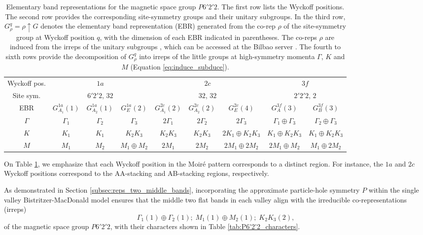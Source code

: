 \begin{table}[H]
\footnotesize
\caption{Elementary band representations for the magnetic space group \( P6'2'2 \). The first row lists the Wyckoff positions. The second row provides the corresponding site-symmetry groups and their unitary subgroups. In the third row, \( G_\rho^q = \rho \uparrow G \) denotes the elementary band representation (EBR) generated from the co-rep \( \rho \) of the site-symmetry group at Wyckoff position \( q \), with the dimension of each EBR indicated in parentheses. The co-reps \( \rho \) are induced from the irreps of the unitary subgroups \cite{bradley_representation_theory_2010}, which can be accessed at the Bilbao server \cite{bilbao_1}. The fourth to sixth rows provide the decomposition of $G_\rho^q$ into irreps of the little groups at high-symmetry momenta $\Gamma$, $K$ and $M$ (Equation \ref{eq:induce_subduce}).}
\centering
\begin{tabular}{|c|c|c|c|c|c|c|c|c|}
\hline
Wyckoff pos. & \multicolumn{3}{c|}{$1a$} & \multicolumn{3}{c|}{$2c$} & \multicolumn{2}{c|}{$3f$} \\
\cline{1-9}
Site sym. & \multicolumn{3}{c|}{$6'2'2$, $32$} & \multicolumn{3}{c|}{$32$, $32$} & \multicolumn{2}{c|}{$2'2'2$, $2$} \\
\cline{1-9}
EBR & $G_{A_1}^{1a}(1)$ & $G_{A_2}^{1a}(1)$ & $G_{E}^{1a}(2)$ & $G_{A_1}^{2c}(2)$ & $G_{A_2}^{2c}(2)$ & $G_{E}^{2c}(4)$   & $G_{A}^{3f}(3)$ & $G_{B}^{3f}(3)$ \\
\hline
$\Gamma$ & $\Gamma_1$ & $\Gamma_2$ & $\Gamma_3$ & $2\Gamma_1$ & $2\Gamma_2$ & $2\Gamma_3$ & $\Gamma_1\oplus \Gamma_3$ & $\Gamma_2\oplus \Gamma_3$ \\
\hline
$K$ & $K_1$ & $K_1$ & $K_2 K_3$ & $K_2 K_3$ & $K_2 K_3$ & $2K_1 \oplus  K_2 K_3$ & $K_1\oplus K_2 K_3$ & $K_1\oplus K_2 K_3$ \\
\hline
$M$ & $M_1$ & $M_2$ & $M_1\oplus M_2$ & $2M_1$ & $2M_2$ & $2M_1\oplus 2M_2$ & $2M_1\oplus M_2$ & $M_1\oplus 2M_2$ \\
\hline
\end{tabular}
\label{tab:P6'2'2-ebrs}
\end{table}

On Table \ref{tab:P6'2'2-ebrs}, we emphasize that each Wyckoff position in the Moiré pattern corresponds to a distinct region. For instance, the \( 1a \) and \( 2c \) Wyckoff positions correspond to the AA-stacking and AB-stacking regions, respectively.

As demonstrated in Section \ref{subsec:reps_two_middle_bands}, incorporating the approximate particle-hole symmetry $P$ within the single valley Bistritzer-MacDonald model ensures that the middle two flat bands in each valley align with the irreducible co-representations (irreps)
\begin{equation} \label{eq:matbg-irreps}
\Gamma_1(1) \oplus \Gamma_2(1); \; M_1(1) \oplus M_2(1); \; K_2 K_3(2),
\end{equation}
of the magnetic space group \( P6'2'2 \), with their characters shown in Table \ref{tab:P6'2'2_characters}.

